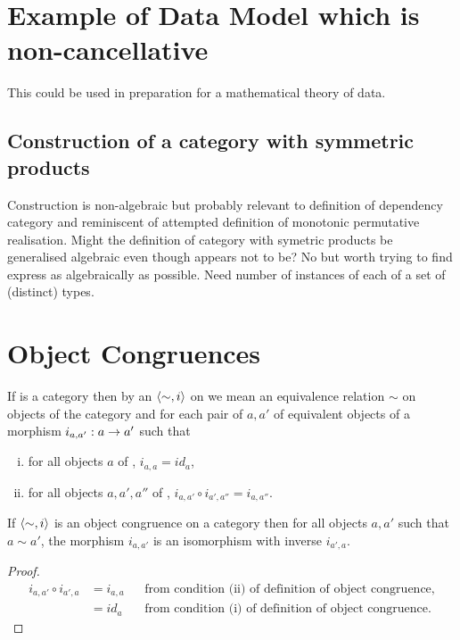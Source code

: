 \documentclass[10pt,a4paper]{scrartcl}
\begin{document}
\newpage
\section{Example of Data Model which is non-cancellative}
This could be used in preparation for a mathematical theory of data.
\subsection{Construction of a category with symmetric products}
Construction is non-algebraic but probably relevant to definition of dependency category
and reminiscent of attempted definition of monotonic permutative realisation.
Might the definition of category with symetric products be generalised algebraic even though appears not to be? No but worth trying to find express as algebraically as possible. Need number of instances of each of a set of (distinct) types. 
  

\section {Object Congruences}

\begin{definition}
If \catcw is a category  then by an  $\langle\sim,i\rangle$ on \catcw we mean  an equivalence relation $\sim$ on objects of the category and for each pair
of $a, a'$ of equivalent objects of \catcw a morphism $i_{a,a'}:a \rightarrow a'$ such that
\begin{enumerate} [(i)]
\item  for all objects $a$ of \catc, $i_{a,a}=id_a$,
\item for all objects $a, a', a''$ of \catc, $i_{a,a'}\circ i_{a',a''}=i_{a,a''}$.
\end{enumerate} 
\end{definition}

\begin{lemma}
If $\langle\sim,i\rangle$ is an object congruence on a category \catcw then
for all objects $a,a'$ such that $a \sim a'$, the morphism $i_{a,a'}$ is an isomorphism with inverse $i_{a',a}$.
\end{lemma}
\begin{proof}
\begin{align*}
i_{a,a'} \circ i_{a',a} &= i_{a,a} &&\mbox{from condition (ii) of definition of object congruence}, \\
                        &= id_a    &&\mbox{from condition (i) of definition of object congruence}.
\end{align*}
\end{proof}
\end{document}
